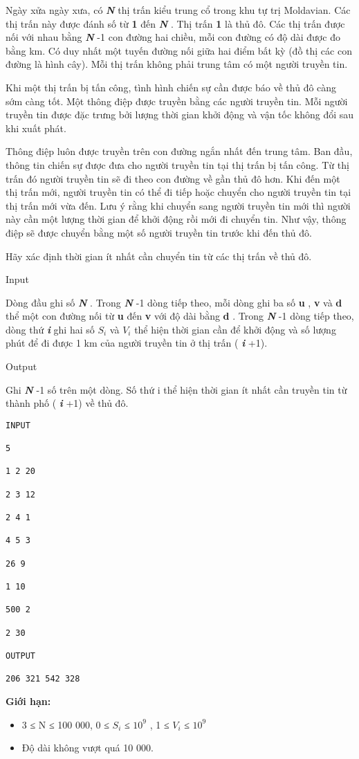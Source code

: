

Ngày xửa ngày xưa, có \textbf{\emph{ N }} thị trấn kiểu trung cổ trong khu tự trị Moldavian. Các thị trấn này được đánh số từ \textbf{ 1 } đến \textbf{\emph{ N }} . Thị trấn \textbf{ 1 } là thủ đô. Các thị trấn được nối với nhau bằng \textbf{\emph{ N }} -1 con đường hai chiều, mỗi con đường có độ dài được đo bằng km. Có duy nhất một tuyến đường nối giữa hai điểm bất kỳ (đồ thị các con đường là hình cây). Mỗi thị trấn không phải trung tâm có một người truyền tin.

Khi một thị trấn bị tấn công, tình hình chiến sự cần được báo về thủ đô càng sớm càng tốt. Một thông điệp được truyền bằng các người truyền tin. Mỗi người truyền tin được đặc trưng bởi lượng thời gian khởi động và vận tốc không đổi sau khi xuất phát.

Thông điệp luôn được truyền trên con đường ngắn nhất đến trung tâm. Ban đầu, thông tin chiến sự được đưa cho người truyền tin tại thị trấn bị tấn công. Từ thị trấn đó người truyền tin sẽ đi theo con đường về gần thủ đô hơn. Khi đến một thị trấn mới, người truyền tin có thể đi tiếp hoặc chuyển cho người truyền tin tại thị trấn mới vừa đến. Lưu ý rằng khi chuyển sang người truyền tin mới thì người này cần một lượng thời gian để khởi động rồi mới đi chuyển tin. Như vậy, thông điệp sẽ được chuyển bằng một số người truyền tin trước khi đến thủ đô.

Hãy xác định thời gian ít nhất cần chuyển tin từ các thị trấn về thủ đô.

Input

Dòng đầu ghi số \textbf{\emph{ N }} . Trong \textbf{\emph{ N }} -1 dòng tiếp theo, mỗi dòng ghi ba số \textbf{ u } , \textbf{ v } và \textbf{ d } thể một con đường nối từ \textbf{ u } đến \textbf{ v } với độ dài bằng \textbf{ d } . Trong \textbf{\emph{ N }} -1 dòng tiếp theo, dòng thứ \textbf{\emph{ i }} ghi hai số \textbf{\emph{ $S_{i}$}} và \textbf{\emph{ $V_{i}$}} thể hiện thời gian cần để khởi động và số lượng phút để đi được 1 km của người truyền tin ở thị trấn ( \textbf{\emph{ i }} +1).

Output

Ghi \textbf{\emph{ N }} -1 số trên một dòng. Số thứ i thể hiện thời gian ít nhất cần truyền tin từ thành phố ( \textbf{\emph{ i }} +1) về thủ đô.
\begin{verbatim}
INPUT

5

1 2 20

2 3 12

2 4 1

4 5 3

26 9

1 10

500 2

2 30

OUTPUT

206 321 542 328\end{verbatim}

\textbf{Giới hạn:}
\begin{itemize}
	\item 3 ≤ N ≤ 100 000, 0 ≤ $S_{i}$ ≤ $10^{9}$ , 1 ≤ $V_{i}$ ≤ $10^{9}$
	\item Độ dài không vượt quá 10 000.
\end{itemize}
